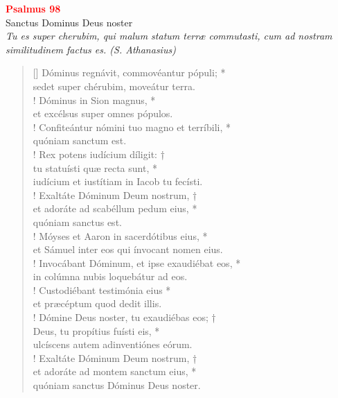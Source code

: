 


\def\greinitialformat#1{%
{\fontsize{39}{39}\selectfont #1}%
}




\vspace{0.3cm}
\begin{center}
 \textcolor{red}{\large \bf Psalmus 98}\\
Sanctus Dominus Deus noster\\
\textit{\small Tu es super cherubim, qui malum statum terræ commutasti, cum ad nostram similitudinem factus es. (S. Athanasius)}
\end{center}
\begin{verse}[\versewidth]
Dóminus regnávit, commovéantur pópuli; *\\
sedet super chérubim, moveátur terra.\\!
\vin Dóminus in Sion magnus, *\\
\vin et excélsus super omnes pópulos.\\!
Confiteántur nómini tuo magno et terríbili, *\\
quóniam sanctum est.\\!
\vin Rex potens iudícium díligit: †\\
\vin tu statuísti quæ recta sunt, *\\
\vin iudícium et iustítiam in Iacob tu fecísti.\\!
Exaltáte Dóminum Deum nostrum, †\\
et adoráte ad scabéllum pedum eius, *\\
quóniam sanctus est.\\!
\vin Móyses et Aaron in sacerdótibus eius, *\\
\vin et Sámuel inter eos qui ínvocant nomen eius.\\!
Invocábant Dóminum, et ipse exaudiébat eos, *\\
in colúmna nubis loquebátur ad eos.\\!
\vin Custodiébant testimónia eius *\\
\vin et præcéptum quod dedit illis.\\!
Dómine Deus noster, tu exaudiébas eos; †\\
Deus, tu propítius fuísti eis, *\\
ulcíscens autem adinventiónes eórum.\\!
\vin Exaltáte Dóminum Deum nostrum, †\\
\vin et adoráte ad montem sanctum eius, *\\
\vin quóniam sanctus Dóminus Deus noster.\\
\end{verse}
\vspace{1cm}


